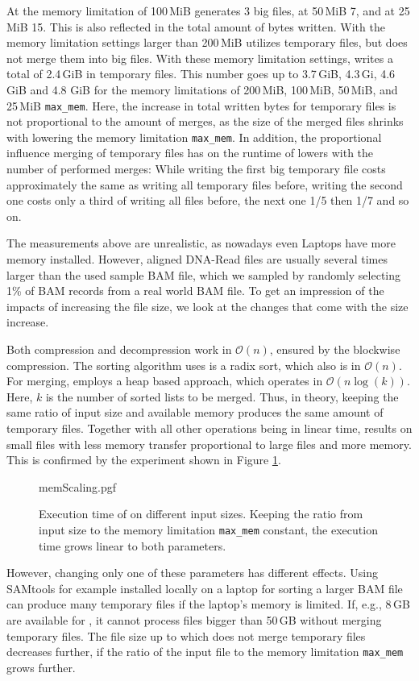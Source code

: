 At the memory limitation of 100\,MiB \sort generates 3 big files, at 50\,MiB 7, and at 25\,MiB 15. This is also reflected in the total amount of bytes written. With the memory limitation settings larger than 200\,MiB \sort utilizes temporary files, but does not merge them into big files. With these memory limitation settings, \sort writes a total of 2.4\,GiB in temporary files. This number goes up to 3.7\,GiB, 4.3\,Gi, 4.6\,GiB and 4.8 GiB for the memory limitations of 200\,MiB, 100\,MiB, 50\,MiB, and 25\,MiB \texttt{max\_mem}. Here, the increase in total written bytes for temporary files is not proportional to the amount of merges, as the size of the merged files shrinks with lowering the memory limitation \texttt{max\_mem}. In addition, the proportional influence merging of temporary files has on the runtime of \sort lowers with the number of performed merges: While writing the first big temporary file costs approximately the same as writing all temporary files before, writing the second one costs only a third of writing all files before, the next one 1/5 then 1/7 and so on.

The measurements above are unrealistic, as nowadays even Laptops have more memory installed. However, aligned DNA-Read files are usually several times larger than the used sample BAM file, which we sampled by randomly selecting 1\% of BAM records from a real world BAM file. To get an impression of the impacts of increasing the file size, we look at the changes that come with the size increase. 

Both compression and decompression work in $\mathcal{O}(n)$, ensured by the blockwise compression. The sorting algorithm \sort uses is a radix sort, which also is in $\mathcal{O}(n)$. For merging, \sort employs a heap based approach, which operates in $\mathcal{O}(n \log(k))$. Here, $k$ is the number of sorted lists to be merged. Thus, in theory, keeping the same ratio of input size and available memory produces the same amount of temporary files. Together with all other operations being in linear time, results on small files with less memory transfer proportional to large files and more memory. This is confirmed by the experiment shown in Figure \ref{fig:memScaling}.

\begin{figure}
        {memScaling.pgf}
    \caption{Execution time of \sort on different input sizes. Keeping the ratio from input size to the memory limitation \texttt{max\_mem} constant, the execution time grows linear to both parameters. \points}
    \label{fig:memScaling}
\end{figure}
However, changing only one of these parameters has different effects. Using SAMtools for example installed locally on a laptop for sorting a larger BAM file can produce many temporary files if the laptop's memory is limited. If, e.g., 8\,GB are available for \sort, it cannot process files bigger than 50\,GB without merging temporary files. The file size up to which \sort does not merge temporary files decreases further, if the ratio of the input file to the memory limitation \texttt{max\_mem} grows further.

